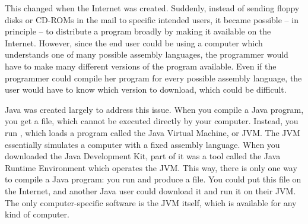This changed when the Internet was created. Suddenly, instead of sending floppy disks or CD-ROMs in the mail to specific intended users, it became possible -- in principle -- to distribute a program broadly by making it available on the Internet. However, since the end user could be using a computer which understands one of many possible assembly languages, the programmer would have to make many different versions of the program available. Even if the programmer could compile her program for every possible assembly language, the user would have to know which version to download, which could be difficult.

Java was created largely to address this issue. When you compile a Java program, you get a  file, which cannot be executed directly by your computer. Instead, you run , which loads a program called the Java Virtual Machine, or JVM. The JVM essentially simulates a computer with a fixed assembly language. When you downloaded the Java Development Kit, part of it was a tool called the Java Runtime Environment which operates the JVM. This way, there is only one way to compile a Java program: you run  and produce a  file. You could put this  file on the Internet, and another Java user could download it and run it on their JVM. The only computer-specific software is the JVM itself, which is available for any kind of computer.